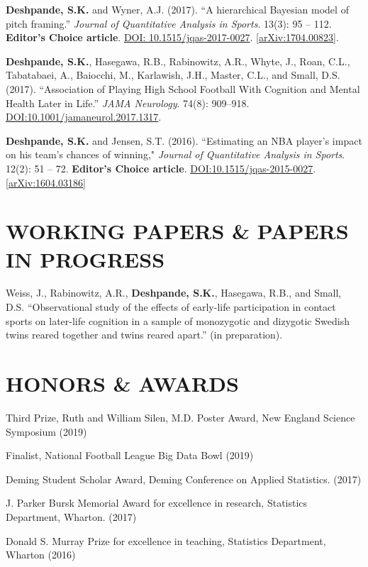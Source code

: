 \documentclass[margin]{res}
\begin{document}
\begin{resume}
\textbf{Deshpande, S.K.} and Wyner, A.J. (2017). ``A hierarchical Bayesian model of pitch framing.'' \textit{Journal of Quantitative Analysis in Sports}. 13(3): 95 -- 112. \textbf{Editor's Choice article}.  \href{https://doi.org/10.1515/jqas-2017-0027}{DOI: 10.1515/jqas-2017-0027}. \href{https://arxiv.org/abs/1704.00823}{[arXiv:1704.00823]}.

\textbf{Deshpande, S.K.}, Hasegawa, R.B., Rabinowitz, A.R., Whyte, J., Roan, C.L., Tabatabaei, A., Baiocchi, M., Karlawish, J.H., Master, C.L., and Small, D.S. (2017). ``Association of Playing High School Football With Cognition and Mental Health Later in Life.'' \textit{JAMA Neurology}. 74(8): 909--918. \href{https://doi.org/10.1001/jamaneurol.2017.1317}{DOI:10.1001/jamaneurol.2017.1317}.

\textbf{Deshpande, S.K.} and Jensen, S.T. (2016). ``Estimating an NBA player's impact on his team's chances of winning," \textit{Journal of Quantitative Analysis in Sports}. 12(2): 51 -- 72. \textbf{Editor's Choice article}. \href{https://doi.org/10.1515/jqas-2015-0027}{DOI:10.1515/jqas-2015-0027}.\href{https://arxiv.org/abs/1604.03186}{[arXiv:1604.03186]}


\section{WORKING PAPERS \& PAPERS IN PROGRESS}

Weiss, J., Rabinowitz, A.R., \textbf{Deshpande, S.K.}, Hasegawa, R.B., and Small, D.S. ``Observational study of the effects of early-life participation in contact sports on later-life cognition in a sample of monozygotic and dizygotic Swedish twins reared together and twins reared apart.'' (in preparation).

\section{HONORS \& AWARDS} 

Third Prize, Ruth and William Silen, M.D. Poster Award, New England Science Symposium (2019)

Finalist, National Football League Big Data Bowl (2019)

Deming Student Scholar Award, Deming Conference on Applied Statistics. (2017)

J. Parker Bursk Memorial Award for excellence in research, Statistics Department, Wharton. (2017)

Donald S. Murray Prize for excellence in teaching, Statistics Department, Wharton (2016)


\end{resume}
\end{document}
